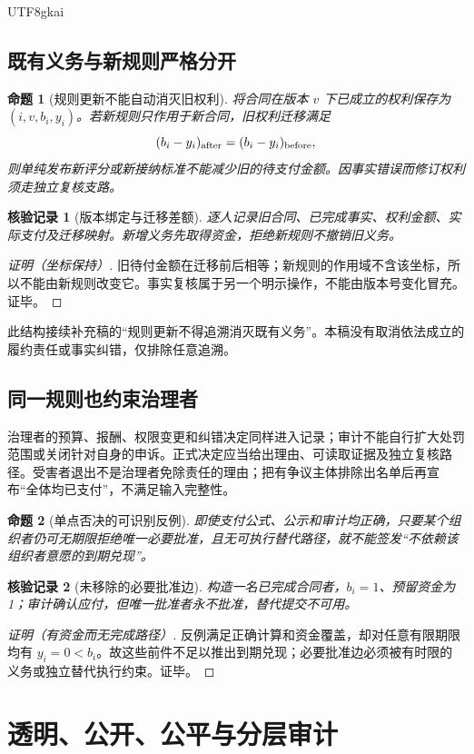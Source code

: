 \documentclass[12pt,a4paper,openany]{report}
\newtheorem{proposition}{命题}[chapter]
\newtheorem{Certificate}{核验记录}[chapter]
\begin{document}
\begin{CJK*}{UTF8}{gkai}
\section{既有义务与新规则严格分开}
\begin{proposition}[规则更新不能自动消灭旧权利]
\label{prop:old-rights}
将合同在版本 $v$ 下已成立的权利保存为 $(i,v,b_i,y_i)$。若新规则只作用于新合同，旧权利迁移满足
\[
 (b_i-y_i)_{\rm after}=(b_i-y_i)_{\rm before},
\]
则单纯发布新评分或新接纳标准不能减少旧的待支付金额。因事实错误而修订权利须走独立复核支路。
\end{proposition}
\begin{Certificate}[版本绑定与迁移差额]
逐人记录旧合同、已完成事实、权利金额、实际支付及迁移映射。新增义务先取得资金，拒绝新规则不撤销旧义务。
\end{Certificate}
\begin{proof}[证明（坐标保持）]
旧待付金额在迁移前后相等；新规则的作用域不含该坐标，所以不能由新规则改变它。事实复核属于另一个明示操作，不能由版本号变化冒充。证毕。
\end{proof}
此结构接续补充稿的“规则更新不得追溯消灭既有义务”\cite{SourceSupplement}。本稿没有取消依法成立的履约责任或事实纠错，仅排除任意追溯。

\section{同一规则也约束治理者}
治理者的预算、报酬、权限变更和纠错决定同样进入记录；审计不能自行扩大处罚范围或关闭针对自身的申诉。正式决定应当给出理由、可读取证据及独立复核路径。受害者退出不是治理者免除责任的理由；把有争议主体排除出名单后再宣布“全体均已支付”，不满足输入完整性。

\begin{proposition}[单点否决的可识别反例]
\label{prop:veto}
即使支付公式、公示和审计均正确，只要某个组织者仍可无期限拒绝唯一必要批准，且无可执行替代路径，就不能签发“不依赖该组织者意愿的到期兑现”。
\end{proposition}
\begin{Certificate}[未移除的必要批准边]
构造一名已完成合同者，$b_i=1$、预留资金为1；审计确认应付，但唯一批准者永不批准，替代提交不可用。
\end{Certificate}
\begin{proof}[证明（有资金而无完成路径）]
反例满足正确计算和资金覆盖，却对任意有限期限均有 $y_i=0<b_i$。故这些前件不足以推出到期兑现；必要批准边必须被有时限的义务或独立替代执行约束。证毕。
\end{proof}
\chapter{透明、公开、公平与分层审计}
\label{chap:audit}

\end{CJK*}
\end{document}
